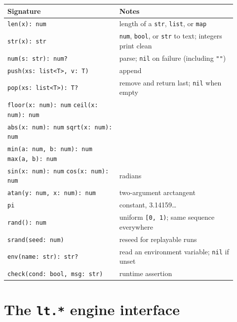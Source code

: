 \begin{center}
\small\begin{tabular}{@{}p{0.45\linewidth}p{0.47\linewidth}@{}}
\toprule
\textbf{Signature} & \textbf{Notes} \\
\midrule
\texttt{len(x): num} & length of a \texttt{str}, \texttt{list}, or \texttt{map} \\
\texttt{str(x): str} & \texttt{num}, \texttt{bool}, or \texttt{str} to text; integers print clean \\
\texttt{num(s: str): num?} & parse; \texttt{nil} on failure (including \texttt{""}) \\
\texttt{push(xs: list<T>, v: T)} & append \\
\texttt{pop(xs: list<T>): T?} & remove and return last; \texttt{nil} when empty \\
\midrule
\texttt{floor(x: num): num} \enskip \texttt{ceil(x: num): num} & \\
\texttt{abs(x: num): num} \enskip \texttt{sqrt(x: num): num} & \\
\texttt{min(a: num, b: num): num} \enskip \texttt{max(a, b): num} & \\
\texttt{sin(x: num): num} \enskip \texttt{cos(x: num): num} & radians \\
\texttt{atan(y: num, x: num): num} & two-argument arctangent \\
\texttt{pi} & constant, 3.14159\ldots \\
\midrule
\texttt{rand(): num} & uniform \texttt{[0, 1)}; same sequence everywhere \\
\texttt{srand(seed: num)} & reseed for replayable runs \\
\texttt{env(name: str): str?} & read an environment variable; \texttt{nil} if unset \\
\texttt{check(cond: bool, msg: str)} & runtime assertion \\
\bottomrule
\end{tabular}
\end{center}

\section*{The \texttt{lt.*} engine interface}


